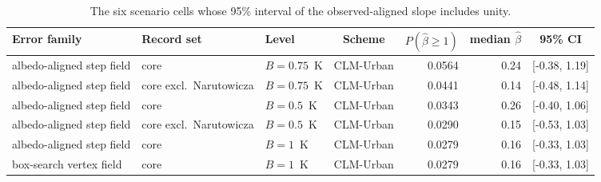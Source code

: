 \begin{table}[!tbp]
\centering\footnotesize
\caption{The six scenario cells whose 95\% interval of the observed-aligned slope includes unity.}
\label{tab:cells}
\setlength{\tabcolsep}{3pt}
\scriptsize
\begin{tabular}{@{}lllcrrc@{}}
\toprule
Error family & Record set & Level & Scheme & $P(\hat\beta\ge1)$ & median $\hat\beta$ & 95\% CI \\
\midrule
albedo-aligned step field & core & $B=0.75$~K & CLM-Urban & 0.0564 & 0.24 & [-0.38, 1.19] \\
albedo-aligned step field & core excl.\ Narutowicza & $B=0.75$~K & CLM-Urban & 0.0441 & 0.14 & [-0.48, 1.14] \\
albedo-aligned step field & core & $B=0.5$~K & CLM-Urban & 0.0343 & 0.26 & [-0.40, 1.06] \\
albedo-aligned step field & core excl.\ Narutowicza & $B=0.5$~K & CLM-Urban & 0.0290 & 0.15 & [-0.53, 1.03] \\
albedo-aligned step field & core & $B=1$~K & CLM-Urban & 0.0279 & 0.16 & [-0.33, 1.03] \\
box-search vertex field & core & $B=1$~K & CLM-Urban & 0.0279 & 0.16 & [-0.33, 1.03] \\
\bottomrule
\end{tabular}
\end{table}
